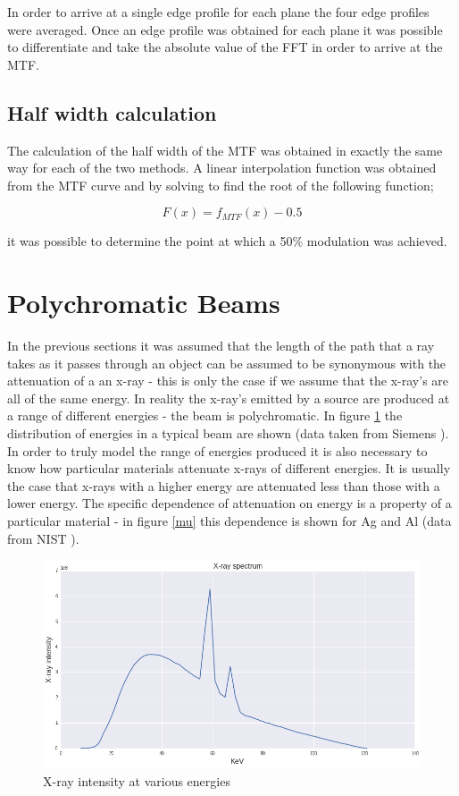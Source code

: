 \documentclass[
  twoside,
  11pt, a4paper,
  footinclude=true,
  headinclude=true,
  cleardoublepage=empty
]{scrbook}
\begin{document}
In order to arrive at a single edge profile for each plane the four edge profiles were averaged. Once an edge profile was obtained for each plane it was possible to differentiate and take the absolute value of the FFT in order to arrive at the MTF.

\subsection{Half width calculation}

The calculation of the half width of the MTF was obtained in exactly the same way for each of the two methods. A linear interpolation function was obtained from the MTF curve and by solving to find the root of the following function;

\[
F(x) = f_{MTF}(x) - 0.5
\]

it was possible to determine the point at which a 50\% modulation was achieved.

\section{Polychromatic Beams}

In the previous sections it was assumed that the length of the path that a ray takes as it passes through an object can be assumed to be synonymous with the attenuation of a an x-ray - this is only the case if we assume that the x-ray's are all of the same energy. In reality the x-ray's emitted by a source are produced at a range of different energies - the beam is polychromatic. In figure \ref{spectrum} the distribution of energies in a typical beam are shown (data taken from Siemens \cite{siemens}). In order to truly model the range of energies produced it is also necessary to know how particular materials attenuate x-rays of different energies. It is usually the case that x-rays with a higher energy are attenuated less than those with a lower energy. The specific dependence of attenuation on energy is a property of a particular material - in figure \ref{mu} this dependence is shown for Ag and Al (data from NIST \cite{NIST}).

\begin{figure}[h!]
  \centering
    \includegraphics[width=\textwidth]{code/Polychromatic/Spectrum_Atenuation_Plots_files/Spectrum_Atenuation_Plots_3_0.png}
    \caption{X-ray intensity at various energies}
    \label{spectrum}
\end{figure}
\end{document}

